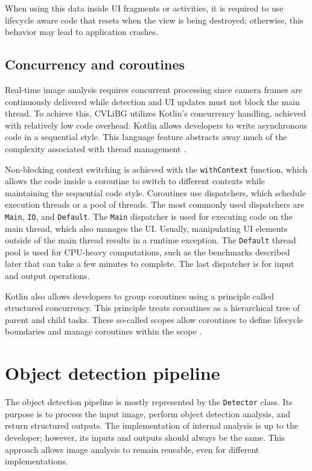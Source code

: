 When using this data inside UI fragments or activities, it is required to use lifecycle aware code that resets when the view is being destroyed; otherwise, this behavior may lead to application crashes.


\subsection{Concurrency and coroutines}
\label{concurrencyExplained}
Real-time image analysis requires concurrent processing since camera frames are continuously delivered while detection and UI updates must not block the main thread. To achieve this, CVLiBG utilizes Kotlin's concurrency handling, achieved with relatively low code overhead. Kotlin allows developers to write asynchronous code in a sequential style. This language feature abstracts away much of the complexity associated with thread management \cite{kotlinConcurrency}.

Non-blocking context switching is achieved with the \texttt{withContext} function, which allows the code inside a coroutine to switch to different contexts while maintaining the sequential code style. Coroutines use dispatchers, which schedule execution threads or a pool of threads. The most commonly used dispatchers are \texttt{Main}, \texttt{IO}, and \texttt{Default}. The \texttt{Main} dispatcher is used for executing code on the main thread, which also manages the UI. Usually, manipulating UI elements outside of the main thread results in a runtime exception. The \texttt{Default} thread pool is used for CPU-heavy computations, such as the benchmarks described later that can take a few minutes to complete. The last dispatcher is for input and output operations.

Kotlin also allows developers to group coroutines using a principle called structured concurrency. This principle treats coroutines as a hierarchical tree of parent and child tasks. These so-called scopes allow coroutines to define lifecycle boundaries and manage coroutines within the scope \cite{kotlinConcurrency}.





\section{Object detection pipeline}
\label{Detector}
The object detection pipeline is mostly represented by the \texttt{Detector} class. Its purpose is to process the input image, perform object detection analysis, and return structured outputs. The implementation of internal analysis is up to the developer; however, its inputs and outputs should always be the same. This approach allows image analysis to remain reusable, even for different implementations.

